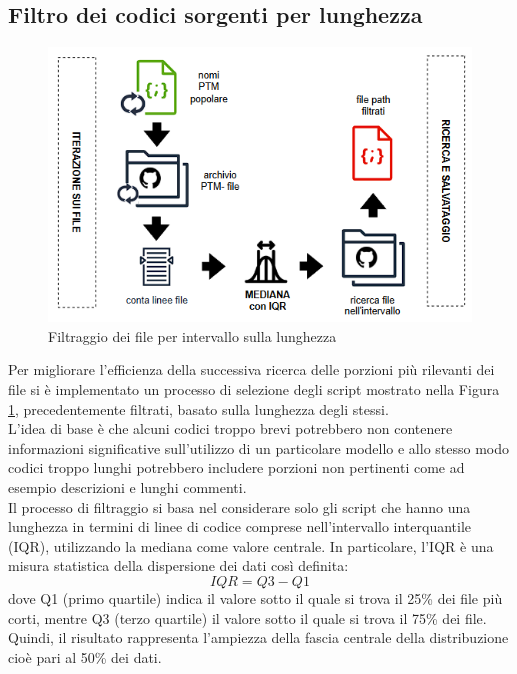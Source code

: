 \documentclass{article}
\begin{document}
\subsection{Filtro dei codici sorgenti per lunghezza}
\begin{figure}[htbp]
    \centering
    \includegraphics[width=\linewidth]{images/approccio_filtro_mediana.png}
    \caption{Filtraggio dei file per intervallo sulla lunghezza}
    \label{fig:filtro_mediana}
\end{figure}
Per migliorare l'efficienza della successiva ricerca delle porzioni più rilevanti dei file si è implementato un processo di selezione degli script mostrato nella Figura \ref{fig:filtro_mediana}, precedentemente filtrati, basato sulla lunghezza degli stessi.\\
L'idea di base è che alcuni codici troppo brevi potrebbero non contenere informazioni significative sull'utilizzo di un particolare modello e allo stesso modo codici troppo lunghi potrebbero includere porzioni non pertinenti come ad esempio descrizioni e lunghi commenti.\\
Il processo di filtraggio si basa nel considerare solo gli script che hanno una lunghezza in termini di linee di codice comprese nell'intervallo interquantile (IQR), utilizzando la mediana come valore centrale. In particolare, l'IQR è una misura statistica della dispersione dei dati così definita:
\begin{equation}
    IQR = Q3 - Q1
\end{equation}
dove Q1 (primo quartile) indica il valore sotto il quale si trova il 25\% dei file più corti, mentre Q3 (terzo quartile) il valore sotto il quale si trova il 75\% dei file. Quindi, il risultato rappresenta l'ampiezza della fascia centrale della distribuzione cioè pari al 50\% dei dati.\\
\end{document}

